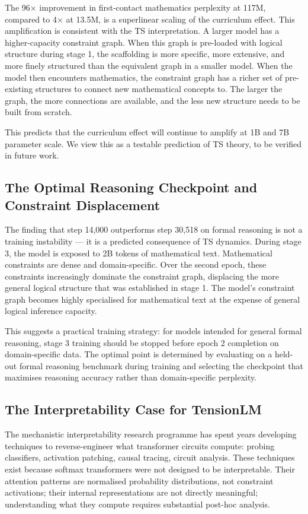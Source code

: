 \documentclass[10pt,a4paper]{article}
\begin{document}
The 96$\times$ improvement in first-contact mathematics perplexity at 117M, compared to 4$\times$ at 13.5M, is a superlinear scaling of the curriculum effect. This amplification is consistent with the TS interpretation. A larger model has a higher-capacity constraint graph. When this graph is pre-loaded with logical structure during stage 1, the scaffolding is more specific, more extensive, and more finely structured than the equivalent graph in a smaller model. When the model then encounters mathematics, the constraint graph has a richer set of pre-existing structures to connect new mathematical concepts to. The larger the graph, the more connections are available, and the less new structure needs to be built from scratch.

This predicts that the curriculum effect will continue to amplify at 1B and 7B parameter scale. We view this as a testable prediction of TS theory, to be verified in future work.

\subsection{The Optimal Reasoning Checkpoint and Constraint Displacement}

The finding that step 14,000 outperforms step 30,518 on formal reasoning is not a training instability --- it is a predicted consequence of TS dynamics. During stage 3, the model is exposed to 2B tokens of mathematical text. Mathematical constraints are dense and domain-specific. Over the second epoch, these constraints increasingly dominate the constraint graph, displacing the more general logical structure that was established in stage 1. The model's constraint graph becomes highly specialised for mathematical text at the expense of general logical inference capacity.

This suggests a practical training strategy: for models intended for general formal reasoning, stage 3 training should be stopped before epoch 2 completion on domain-specific data. The optimal point is determined by evaluating on a held-out formal reasoning benchmark during training and selecting the checkpoint that maximises reasoning accuracy rather than domain-specific perplexity.

\subsection{The Interpretability Case for TensionLM}

The mechanistic interpretability research programme has spent years developing techniques to reverse-engineer what transformer circuits compute: probing classifiers, activation patching, causal tracing, circuit analysis. These techniques exist because softmax transformers were not designed to be interpretable. Their attention patterns are normalised probability distributions, not constraint activations; their internal representations are not directly meaningful; understanding what they compute requires substantial post-hoc analysis.
\end{document}
